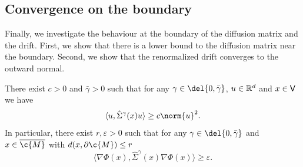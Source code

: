 \subsection{Convergence on the boundary}
\label{sec:convergence_boundary}

Finally, we investigate the behaviour at the boundary of the diffusion matrix and the drift.
First, we show that there is a lower bound to the diffusion matrix near the boundary.
Second, we show that the renormalized drift converges to the outward normal.

\begin{proposition}
	\label{prop:condition_duo_iii}
	There exist $c > 0$ and $\bar{\gamma} >0$ such that for any $\gamma \in \del{0, \bar{\gamma}}$, $u \in \mathbb{R}^d$ and $x \in \sf{V}$ we have \begin{equation} \label{eq:lower_bound_diffusion} \langle u, \hat{\Sigma}^\gamma(x) u \rangle \geq c \norm{u}^2 .
	\end{equation}
	In particular, there exist $r, \varepsilon >0$ such that for any $\gamma \in \del{0, \bar{\gamma}}$ and $x \in \cl{\c{M}}$ with $d(x, \partial \c{M}) \leq r$ \begin{equation} \label{eq:lower_boundary} \langle \nabla \Phi(x), \hat{\Sigma}^\gamma(x) \nabla \Phi(x) \rangle \geq \varepsilon .
	\end{equation}
\end{proposition}

